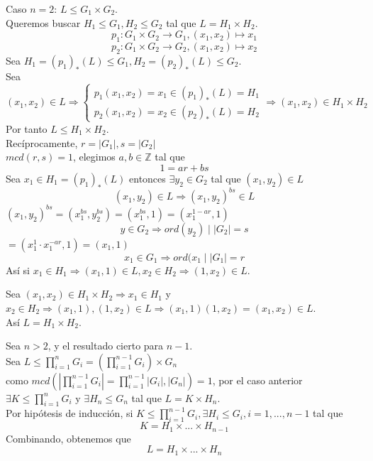 \documentclass[11pt,a4paper]{article}
\begin{document}
\begin{enumerate*}
Caso $n = 2$: $L \leqslant G_{1} \times G_{2}$. \\
Queremos buscar $H_{1} \leqslant G_{1}, H_{2} \leqslant G_{2}$ tal que $L = H_{1} \times H_{2}$.
$$p_{1}: G_{1} \times G_{2} \to G_{1}, (x_{1}, x_{2}) \mapsto x_{1}$$
$$p_{2}: G_{1} \times G_{2} \to G_{2}, (x_{1}, x_{2}) \mapsto x_{2}$$
Sea $H_{1} = (p_{1})_{*} (L) \leqslant G_{1}, H_{2} = (p_{2})_{*}(L) \leqslant G_{2}$. \\
Sea $(x_{1}, x_{2}) \in L \Rightarrow
\begin{cases}
p_{1}(x_{1}, x_{2}) = x_{1} \in (p_{1})_{*}(L) = H_{1} \\
p_{2}(x_{1}, x_{2}) = x_{2} \in (p_{2})_{*}(L) = H_{2}
\end{cases}
\Rightarrow (x_{1}, x_{2}) \in H_{1} \times H_{2}$ \\
Por tanto $L \leqslant H_{1} \times H_{2}$. \\
Recíprocamente, $r = |G_{1}|, s = |G_{2}|$ \\
$mcd(r,s) = 1$, elegimos $a,b \in \mathbb{Z}$ tal que
$$1 = ar + bs$$
Sea $x_{1} \in H_{1} = (p_{1})_{*}(L)$ entonces $\exists y_{2} \in G_{2}$ tal que $(x_{1}, y_{2}) \in L$
$$(x_{1}, y_{2}) \in L \Rightarrow (x_{1}, y_{2})^{bs} \in L$$
$(x_{1}, y_{2})^{bs} = (x_{1}^{bs}, y_{2}^{bs}) = (x_{1}^{bs}, 1) = (x_{1}^{1-ar}, 1)$
$$y \in G_{2} \Rightarrow ord(y_{2}) \mid |G_{2}| = s$$
$= (x_{1}^{1} \cdot x_{1}^{-ar}, 1) = (x_{1}, 1)$
$$x_{1} \in G_{1} \Rightarrow ord(x_{1} \mid |G_{1}| = r$$
Así si $x_{1} \in H_{1} \Rightarrow (x_{1}, 1) \in L, x_{2} \in H_{2} \Rightarrow (1, x_{2}) \in L$.

Sea $(x_{1}, x_{2}) \in H_{1} \times H_{2} \Rightarrow x_{1} \in H_{1}$ y $x_{2} \in H_{2} \Rightarrow (x_{1}, 1), (1, x_{2}) \in L \Rightarrow (x_{1}, 1) (1, x_{2}) = (x_{1}, x_{2}) \in L$. \\
Así $L = H_{1} \times H_{2}$.

Sea $n > 2$, y el resultado cierto para $n-1$. \\
Sea $L \leqslant \prod_{i=1}^{n} G_{i} = (\prod_{i=1}^{n-1} G_{i}) \times G_{n}$ \\
como $mcd( |\prod_{i=1}^{n-1} G_{i}| = \prod_{i=1}^{n-1}|G_{i}|, |G_{n}|) = 1$, por el caso anterior $\exists K \leqslant \prod_{i=1}^{n} G_{i} \text{ y } \exists H_{n} \leqslant G_{n}$ tal que $L = K \times H_{n}$. \\
Por hipótesis de inducción, si $K \leqslant \prod_{i=1}^{n-1} G_{i}, \exists H_{i} \leqslant G_{i}, i = 1, ..., n-1$ tal que
$$K = H_{1} \times ... \times H_{n-1}$$
Combinando, obtenemos que
$$L = H_{1} \times ... \times H_{n}$$
\end{enumerate*}
\end{document}
